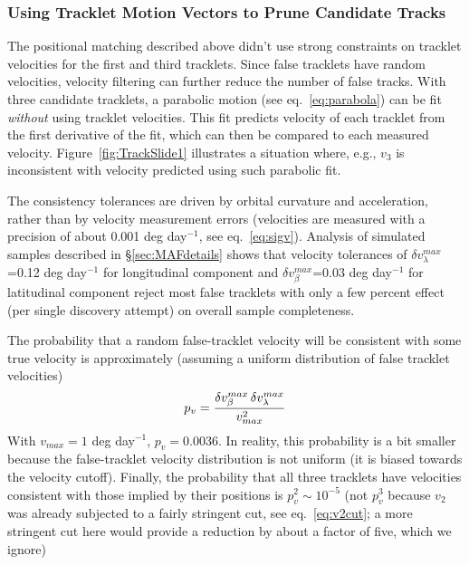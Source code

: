 
\subsubsection{Using Tracklet Motion Vectors to Prune Candidate Tracks} 

The positional matching described above didn't use strong constraints on tracklet velocities
for the first and third tracklets. Since false tracklets have random velocities, velocity filtering
can further reduce the number of false tracks. 
With three candidate tracklets, a parabolic motion (see eq.~\ref{eq:parabola}) can be fit {\it without}
using tracklet velocities. This fit predicts velocity of each tracklet from the first derivative of
the fit, which can then be compared to each measured velocity. Figure~\ref{fig:TrackSlide1} 
illustrates a situation where, e.g., $v_3$ is inconsistent with velocity predicted using such
parabolic fit. 

The consistency tolerances are driven by orbital curvature and acceleration, rather than
by velocity measurement errors (velocities are measured with a precision of about 0.001 
deg day$^{-1}$, see eq.~\ref{eq:sigv}). Analysis of simulated samples described in 
\S\ref{sec:MAFdetails} shows that velocity tolerances of $\delta v_\lambda^{max}$=0.12 deg day$^{-1}$ 
for longitudinal component and $\delta v_\beta^{max}$=0.03 deg day$^{-1}$ for latitudinal component
reject most false tracklets with only a few percent effect (per single discovery attempt) on overall 
sample completeness. 

The probability that a random false-tracklet velocity will be consistent with some true
velocity is approximately (assuming a uniform distribution of false tracklet velocities)
\begin{equation}
        p_v =  { \delta v_\beta^{max} \, \delta v_\lambda^{max} \over  v_{max}^2 }
\end{equation}
With $v_{max} = 1$ deg day$^{-1}$, $p_v = 0.0036$. In reality, this probability is a bit smaller because
the false-tracklet velocity distribution is not uniform (it is biased towards the velocity cutoff). 
Finally, the probability that all three tracklets have velocities consistent with those
implied by their positions is $p_v^2 \sim 10^{-5}$ (not $p_v^3$ because $v_2$ was already 
subjected to a fairly stringent cut, see eq.~\ref{eq:v2cut}; a more stringent cut here 
would provide a reduction by about a factor of five, which we ignore)

